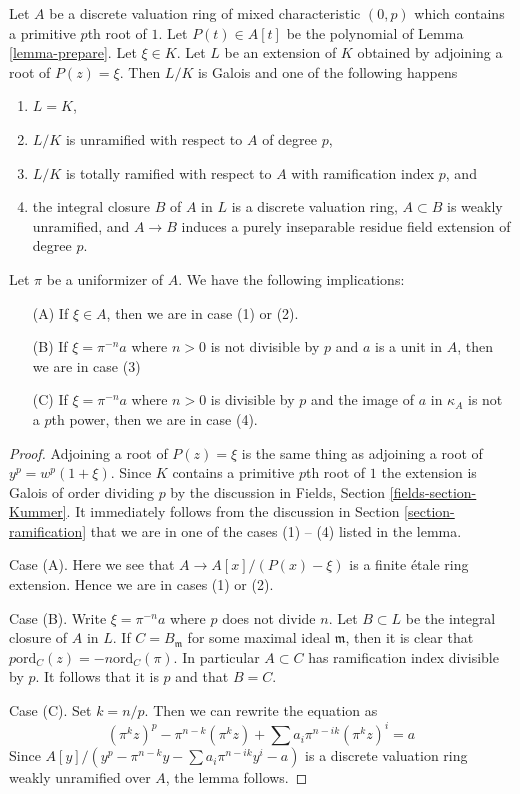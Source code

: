 \begin{lemma}
\label{lemma-extension-defined-by-nice-polynial}
Let $A$ be a discrete valuation ring of mixed characteristic $(0, p)$
which contains a primitive $p$th root of $1$.
Let $P(t) \in A[t]$ be the polynomial of Lemma \ref{lemma-prepare}.
Let $\xi \in K$.
Let $L$ be an extension of $K$ obtained by
adjoining a root of $P(z) = \xi$. Then $L/K$ is Galois and one of the
following happens
\begin{enumerate}
\item $L = K$,
\item $L/K$ is unramified with respect to $A$ of degree $p$,
\item $L/K$ is totally ramified with respect to $A$
with ramification index $p$, and
\item the integral closure $B$ of $A$ in $L$ is a discrete valuation ring,
$A \subset B$ is weakly unramified, and $A \to B$ induces a purely inseparable
residue field extension of degree $p$.
\end{enumerate}
Let $\pi$ be a uniformizer of $A$. We have the following implications:
\begin{enumerate}
\item[(A)] If $\xi \in A$, then we are in case (1) or (2).
\item[(B)] If $\xi = \pi^{-n}a$ where $n > 0$ is not divisible by
$p$ and $a$ is a unit in $A$, then we are in case (3)
\item[(C)] If $\xi = \pi^{-n} a$ where $n > 0$ is divisible by $p$ and
the image of $a$ in $\kappa_A$ is not a $p$th power, then we are in case (4).
\end{enumerate}
\end{lemma}

\begin{proof}
Adjoining a root of $P(z) = \xi$ is the same thing as adjoining a root
of $y^p = w^p(1 + \xi)$. Since $K$ contains a primitive $p$th root of $1$
the extension is Galois of order dividing $p$ by the discussion in
Fields, Section \ref{fields-section-Kummer}.
It immediately follows from the discussion in
Section \ref{section-ramification} that we are in one of the cases (1) -- (4)
listed in the lemma.

\medskip\noindent
Case (A). Here we see that $A \to A[x]/(P(x) - \xi)$ is a finite
\'etale ring extension. Hence we are in cases (1) or (2).

\medskip\noindent
Case (B). Write $\xi = \pi^{-n}a$ where $p$ does not divide $n$.
Let $B \subset L$ be the integral closure of $A$ in $L$.
If $C = B_\mathfrak m$ for some maximal ideal $\mathfrak m$,
then it is clear that $p \text{ord}_C(z) = -n \text{ord}_C(\pi)$.
In particular $A \subset C$ has ramification index divisible by $p$.
It follows that it is $p$ and that $B = C$.

\medskip\noindent
Case (C). Set $k = n/p$. Then we can rewrite the equation as
$$
(\pi^kz)^p - \pi^{n - k} (\pi^kz) + \sum a_i \pi^{n - ik} (\pi^kz)^i = a
$$
Since $A[y]/(y^p - \pi^{n - k}y - \sum  a_i \pi^{n - ik} y^i - a)$
is a discrete valuation ring weakly unramified over $A$, the lemma follows.
\end{proof}


